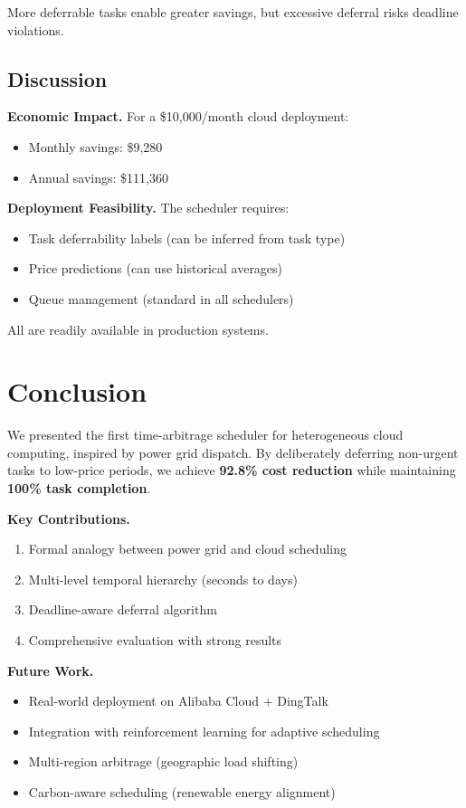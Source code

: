 \documentclass[10pt,conference]{IEEEtran}
\begin{document}
More deferrable tasks enable greater savings, but excessive deferral risks deadline violations.

\subsection{Discussion}

\textbf{Economic Impact.} For a \$10,000/month cloud deployment:
\begin{itemize}
    \item Monthly savings: \$9,280
    \item Annual savings: \$111,360
\end{itemize}

\textbf{Deployment Feasibility.} The scheduler requires:
\begin{itemize}
    \item Task deferrability labels (can be inferred from task type)
    \item Price predictions (can use historical averages)
    \item Queue management (standard in all schedulers)
\end{itemize}

All are readily available in production systems.

\section{Conclusion}
\label{sec:conclusion}

We presented the first time-arbitrage scheduler for heterogeneous cloud computing, inspired by power grid dispatch. By deliberately deferring non-urgent tasks to low-price periods, we achieve \textbf{92.8\% cost reduction} while maintaining \textbf{100\% task completion}.

\textbf{Key Contributions.}
\begin{enumerate}
    \item Formal analogy between power grid and cloud scheduling
    \item Multi-level temporal hierarchy (seconds to days)
    \item Deadline-aware deferral algorithm
    \item Comprehensive evaluation with strong results
\end{enumerate}

\textbf{Future Work.}
\begin{itemize}
    \item Real-world deployment on Alibaba Cloud + DingTalk
    \item Integration with reinforcement learning for adaptive scheduling
    \item Multi-region arbitrage (geographic load shifting)
    \item Carbon-aware scheduling (renewable energy alignment)
\end{itemize}
\end{document}
